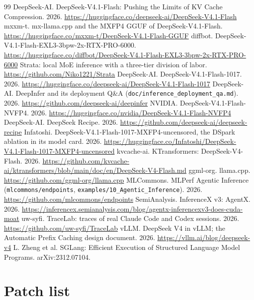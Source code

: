 \documentclass[11pt,a4paper]{article}
\newcommand{\code}[1]{\texttt{#1}}
\begin{document}
\begin{thebibliography}{99}
 DeepSeek-AI. DeepSeek-V4.1-Flash: Pushing the Limits of KV Cache Compression. 2026. \url{https://huggingface.co/deepseek-ai/DeepSeek-V4.1-Flash}
 mxxm-t. mx-llama.cpp and the MXFP4 GGUF of DeepSeek-V4.1-Flash. \url{https://huggingface.co/mxxm-t/DeepSeek-V4.1-Flash-GGUF}
 diffbot. DeepSeek-V4.1-Flash-EXL3-3bpw-2x-RTX-PRO-6000. \url{https://huggingface.co/diffbot/DeepSeek-V4.1-Flash-EXL3-3bpw-2x-RTX-PRO-6000}
 Strata: local MoE inference with a three-tier division of labor. \url{https://github.com/Niko1221/Strata}
 DeepSeek-AI. DeepSeek-V4.1-Flash-1017. 2026. \url{https://huggingface.co/deepseek-ai/DeepSeek-V4.1-Flash-1017}
 DeepSeek-AI. DeepInfer and its deployment Q\&A (\code{doc/inference\_deployment\_qa.md}). 2026. \url{https://github.com/deepseek-ai/deepinfer}
 NVIDIA. DeepSeek-V4.1-Flash-NVFP4. 2026. \url{https://huggingface.co/nvidia/DeepSeek-V4.1-Flash-NVFP4}
 DeepSeek-AI. DeepSeek Recipe. 2026. \url{https://github.com/deepseek-ai/deepseek-recipe}
 Infatoshi. DeepSeek-V4.1-Flash-1017-MXFP4-uncensored, the DSpark ablation in its model card. 2026. \url{https://huggingface.co/Infatoshi/DeepSeek-V4.1-Flash-1017-MXFP4-uncensored}
 kvcache-ai. KTransformers: DeepSeek-V4-Flash. 2026. \url{https://github.com/kvcache-ai/ktransformers/blob/main/doc/en/DeepSeek-V4-Flash.md}
 ggml-org. llama.cpp. \url{https://github.com/ggml-org/llama.cpp}
 MLCommons. MLPerf Agentic Inference (\code{mlcommons/endpoints}, \code{examples/10\_Agentic\_Inference}). 2026. \url{https://github.com/mlcommons/endpoints}
 SemiAnalysis. InferenceX v3: AgentX. 2026. \url{https://inferencex.semianalysis.com/blog/agentx-inferencexv3-does-cuda-moat}
 uw-syfi. TraceLab: traces of real Claude Code and Codex sessions. 2026. \url{https://github.com/uw-syfi/TraceLab}
 vLLM. DeepSeek V4 in vLLM; the Automatic Prefix Caching design document. 2026. \url{https://vllm.ai/blog/deepseek-v4}
 L. Zheng et al. SGLang: Efficient Execution of Structured Language Model Programs. arXiv:2312.07104.
\end{thebibliography}

\newpage
\appendix

\section{Patch list}
\end{document}
